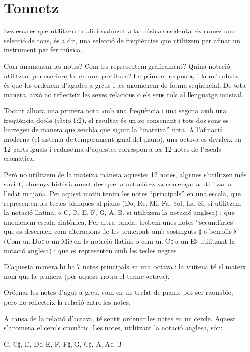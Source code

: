 \section{Tonnetz}
Les escales que utilitzem tradicionalment a la música occidental és només una selecció de tons, és a dir, una selecció de freqüències que utilitzem per afinar un instrument per fer música.

Com anomenem les notes? Com les representem gràficament? Quina notació utilitzem per escriure-les en una partitura? La primera resposta, i la més obvia, és que les ordenem d'agudes a greus i les anomenem de forma seqüencial. De tota manera, això no reflecteix les seves relacions o els seus rols al llenguatge musical.

Tocant alhora una primera nota amb una freqüència i una segona amb una freqüència doble (ràtio 1:2), el resultat és un so consonant i tots dos sons es barregen de manera que sembla que siguin la ``mateixa'' nota. A l'afinació moderna (el sistema de temperament igual del piano), una octava es divideix en 12 parts iguals i cadascuna d'aquestes correspon a les 12 notes de l'escala cromàtica.

Però no utilitzem de la mateixa manera aquestes 12 notes, algunes s'utilitzen més sovint, almenys històricament des que la notació es va començar a utilitzar a l'edat mitjana. Per aquest motiu tenim les notes ``principals'' en una escala, que representen les tecles blanques al piano (Do, Re, Mi, Fa, Sol, La, Si, si utilitzem la notació llatina, o C, D, E, F, G, A, B, si utilitzem la notació anglesa) i que anomenem escala diatònica. Per altra banda, trobem unes notes ``secundàries'' que es descriuen com alteracions de les principals amb sostinguts $\sharp$ o bemolls $\flat$  (Com un Do$\sharp$ o un Mi$\flat$ en la notació llatina o com un C$\sharp$ o un E$\flat$ utilitzant la notació anglesa) i que es representen amb les tecles negres.

D'aquesta manera hi ha 7 notes principals en una octava i la vuitena té el mateix nom que la primera (per aquest motiu el terme octava).

Ordenar les notes d'agut a greu, com en un teclat de piano, pot ser raonable, però no reflecteix la relació entre les notes.

A causa de la relació d'octava, té sentit ordenar  les notes en un cercle. Aquest s'anomena el cercle cromàtic. Les notes, utilitzant la notació anglesa, són:

\begin{center}
C, C$\sharp$, D, D$\sharp$, E, F, F$\sharp$, G, G$\sharp$, A, A$\sharp$, B
\end{center}

